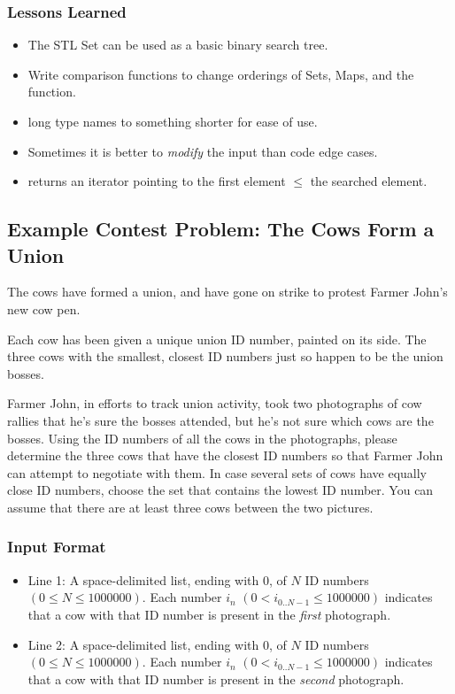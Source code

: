 \subsubsection{Lessons Learned}
\begin{itemize}
	\item The STL Set can be used as a basic binary search tree.
	\item Write comparison functions to change orderings of Sets, Maps, and the  function.
	\item {} long type names to something shorter for ease of use.
	\item Sometimes it is better to \emph{modify} the input than code edge cases.
	\item {} returns an iterator pointing to the first element $\leq$ the searched element.
\end{itemize}

\subsection{Example Contest Problem: The Cows Form a Union}
The cows have formed a union, and have gone on strike to protest Farmer John's new cow pen.

Each cow has been given a unique union ID number, painted on its side.
The three cows with the smallest, closest ID numbers just so happen to be the union bosses.

Farmer John, in efforts to track union activity, took two photographs of cow rallies that he's sure the bosses attended, but he's not sure which cows are the bosses.
Using the ID numbers of all the cows in the photographs, please determine the three cows that have the closest ID numbers so that Farmer John can attempt to negotiate with them.
In case several sets of cows have equally close ID numbers, choose the set that contains the lowest ID number.
You can assume that there are at least three cows between the two pictures.

\subsubsection{Input Format}
\begin{itemize}
	\item Line 1: A space-delimited list, ending with $0$, of $N$ ID numbers $(0 \leq N \leq 1000000)$. 
		Each number $i_n$ $(0 < i_{0..N-1} \leq 1000000)$ indicates that a cow with that ID number is present in the \emph{first} photograph.
	\item Line 2: A space-delimited list, ending with $0$, of $N$ ID numbers $(0 \leq N \leq 1000000)$. 
		Each number $i_n$ $(0 < i_{0..N-1} \leq 1000000)$ indicates that a cow with that ID number is present in the \emph{second} photograph.
\end{itemize}

